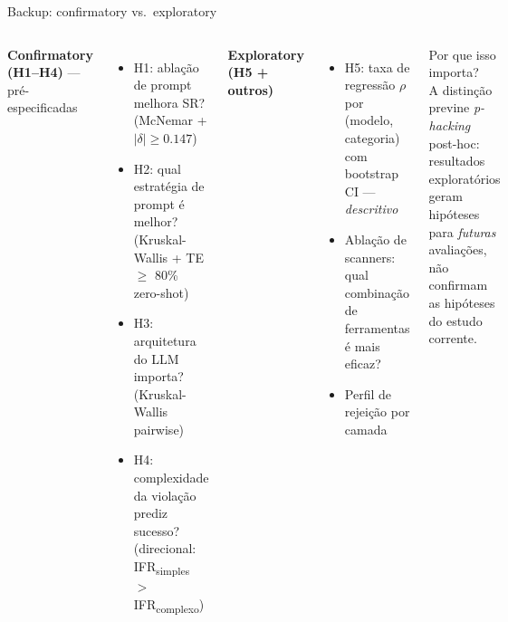\documentclass[aspectratio=169]{beamer}
\begin{document}
\begin{frame}[noframenumbering]{Backup: confirmatory vs.\ exploratory}
\small
\begin{columns}[T]
\textbf{Confirmatory (H1--H4)} --- pré-especificadas
\begin{itemize}
  \item H1: ablação de prompt melhora SR?
        (McNemar + $|\delta| \geq 0.147$)
  \item H2: qual estratégia de prompt é melhor?
        (Kruskal-Wallis + TE $\geq$ 80\% zero-shot)
  \item H3: arquitetura do LLM importa?
        (Kruskal-Wallis pairwise)
  \item H4: complexidade da violação prediz sucesso?
        (direcional: IFR\textsubscript{simples} $>$ IFR\textsubscript{complexo})
\end{itemize}

\textbf{Exploratory (H5 + outros)}
\begin{itemize}
  \item H5: taxa de regressão $\rho$ por (modelo, categoria)\\
        com bootstrap CI --- \emph{descritivo}
  \item Ablação de scanners: qual combinação de ferramentas é mais eficaz?
  \item Perfil de rejeição por camada
\end{itemize}

\vspace{0.5em}
\alert{Por que isso importa?}\\
A distinção previne \emph{p-hacking} post-hoc:
resultados exploratórios geram hipóteses para \emph{futuras} avaliações,
não confirmam as hipóteses do estudo corrente.
\end{columns}
\end{frame}
\end{document}
